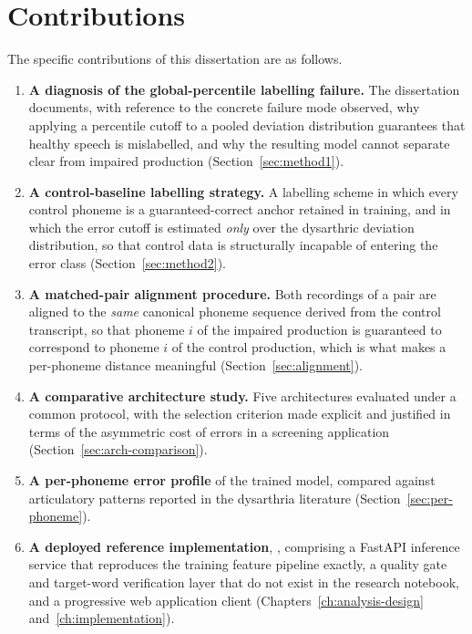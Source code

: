 \section{Contributions}
\label{sec:contributions}

The specific contributions of this dissertation are as follows.

\begin{enumerate}[label=\textbf{C\arabic*.},leftmargin=1.4cm]
  \item \textbf{A diagnosis of the global-percentile labelling failure.} The
        dissertation documents, with reference to the concrete failure mode
        observed, why applying a percentile cutoff to a pooled deviation
        distribution guarantees that healthy speech is mislabelled, and why the
        resulting model cannot separate clear from impaired production
        (Section~\ref{sec:method1}).
  \item \textbf{A control-baseline labelling strategy.} A labelling scheme in
        which every control phoneme is a guaranteed-correct anchor retained in
        training, and in which the error cutoff is estimated \emph{only} over
        the dysarthric deviation distribution, so that control data is
        structurally incapable of entering the error class
        (Section~\ref{sec:method2}).
  \item \textbf{A matched-pair alignment procedure.} Both recordings of a pair
        are aligned to the \emph{same} canonical phoneme sequence derived from
        the control transcript, so that phoneme $i$ of the impaired production
        is guaranteed to correspond to phoneme $i$ of the control production,
        which is what makes a per-phoneme distance meaningful
        (Section~\ref{sec:alignment}).
  \item \textbf{A comparative architecture study.} Five architectures evaluated
        under a common protocol, with the selection criterion made explicit and
        justified in terms of the asymmetric cost of errors in a screening
        application (Section~\ref{sec:arch-comparison}).
  \item \textbf{A per-phoneme error profile} of the trained model, compared
        against articulatory patterns reported in the dysarthria literature
        (Section~\ref{sec:per-phoneme}).
  \item \textbf{A deployed reference implementation}, \systemName, comprising a
        FastAPI inference service that reproduces the training feature pipeline
        exactly, a quality gate and target-word verification layer that do not
        exist in the research notebook, and a progressive web application
        client (Chapters~\ref{ch:analysis-design} and~\ref{ch:implementation}).
\end{enumerate}


